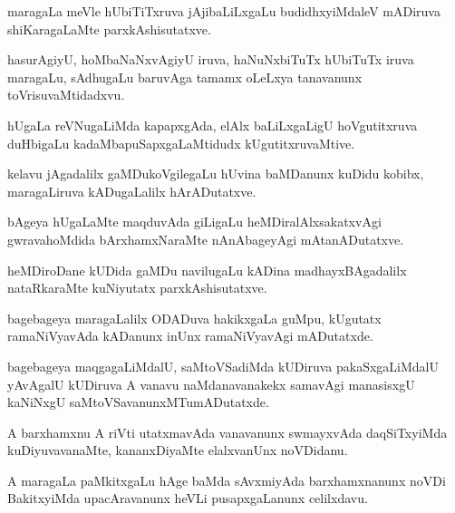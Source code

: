 \documentclass{article}
\begin{document}
\begin{mn}
maragaLa meVle hUbiTiTxruva jAjibaLiLxgaLu budidhxyiMdaleV mADiruva
shiKaragaLaMte parxkAshisutatxve.
\end{mn}

\begin{mn}
hasurAgiyU, hoMbaNaNxvAgiyU iruva, haNuNxbiTuTx hUbiTuTx iruva
maragaLu, sAdhugaLu baruvAga tamamx oLeLxya tanavanunx toVrisuvaMtidadxvu.
\end{mn}

\begin{mn}
hUgaLa reVNugaLiMda kapapxgAda, elAlx baLiLxgaLigU hoVgutitxruva
duHbigaLu kadaMbapuSapxgaLaMtidudx kUgutitxruvaMtive.
\end{mn}

\begin{mn}
kelavu jAgadalilx gaMDukoVgilegaLu hUvina baMDanunx kuDidu kobibx,
maragaLiruva kADugaLalilx hArADutatxve.
\end{mn}

\begin{mn}
bAgeya hUgaLaMte maqduvAda giLigaLu heMDiralAlxsakatxvAgi
gwravahoMdida bArxhamxNaraMte nAnAbageyAgi mAtanADutatxve.
\end{mn}

\begin{mn}%
heMDiroDane kUDida gaMDu navilugaLu kADina madhayxBAgadalilx
nataRkaraMte kuNiyutatx parxkAshisutatxve.
\end{mn}

\begin{mn}
bagebageya maragaLalilx ODADuva hakikxgaLa guMpu, kUgutatx
ramaNiVyavAda kADanunx inUnx ramaNiVyavAgi mADutatxde.
\end{mn}

\begin{mn}
bagebageya maqgagaLiMdalU, saMtoVSadiMda kUDiruva pakaSxgaLiMdalU
yAvAgalU kUDiruva A vanavu naMdanavanakekx samavAgi manasisxgU
kaNiNxgU saMtoVSavanunxMTumADutatxde.
\end{mn}

\begin{mn}%
A barxhamxnu A riVti utatxmavAda vanavanunx swmayxvAda daqSiTxyiMda
kuDiyuvavanaMte, kananxDiyaMte elalxvanUnx noVDidanu.
\end{mn}

\begin{mn}
A maragaLa paMkitxgaLu hAge baMda sAvxmiyAda barxhamxnanunx noVDi
BakitxyiMda upacAravanunx heVLi pusapxgaLanunx celilxdavu.
\end{mn}
\end{document}
